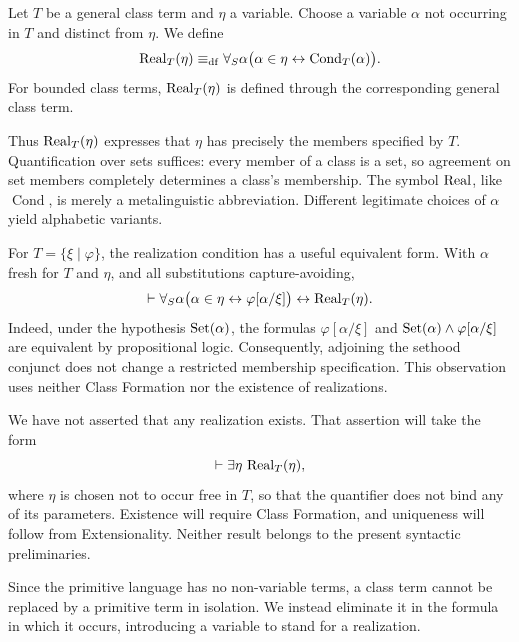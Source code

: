 \begin{definition}
\label{def:technical-realization-of-class-term}
Let \(T\) be a general class term and \(\eta\) a variable. Choose a
variable \(\alpha\) not occurring in \(T\) and distinct from
\(\eta\). We define
\[
\operatorname{Real}_T(\eta)
\mathrel{\equiv_{\mathrm{df}}}
\forall_S\alpha\bigl(
\alpha\in\eta
\leftrightarrow
\operatorname{Cond}_T(\alpha)
\bigr).
\]
For bounded class terms, \(\operatorname{Real}_T(\eta)\) is defined through the
corresponding general class term.
\end{definition}

Thus \(\operatorname{Real}_T(\eta)\) expresses that \(\eta\) has precisely the
members specified by \(T\). Quantification over sets suffices:
every member of a class is a set, so agreement on set members
completely determines a class's membership. The symbol \(\operatorname{Real}\),
like \(\operatorname{Cond}\), is merely a metalinguistic abbreviation.
Different legitimate choices of \(\alpha\) yield alphabetic variants.

For \(T=\{\xi\mid\varphi\}\), the realization condition has a
useful equivalent form. With \(\alpha\) fresh for \(T\) and
\(\eta\), and all substitutions capture-avoiding,
\[
\vdash
\forall_S\alpha\bigl(
\alpha\in\eta\leftrightarrow\varphi[\alpha/\xi]
\bigr)
\leftrightarrow
\operatorname{Real}_T(\eta).
\]
Indeed, under the hypothesis \(\operatorname{Set}(\alpha)\), the formulas
\(\varphi[\alpha/\xi]\) and
\(\operatorname{Set}(\alpha)\land\varphi[\alpha/\xi]\) are equivalent by
propositional logic. Consequently, adjoining the sethood conjunct
does not change a restricted membership specification. This
observation uses neither Class Formation nor the existence of
realizations.

We have not asserted that any realization exists. That assertion will
take the form
\[
\vdash\exists\eta\,\operatorname{Real}_T(\eta),
\]
where \(\eta\) is chosen not to occur free in \(T\), so that the
quantifier does not bind any of its parameters. Existence will require
Class Formation, and uniqueness will follow from Extensionality.
Neither result belongs to the present syntactic preliminaries.


Since the primitive language has no non-variable terms, a class term
cannot be replaced by a primitive term in isolation. We instead
eliminate it in the formula in which it occurs, introducing a variable
to stand for a realization.

